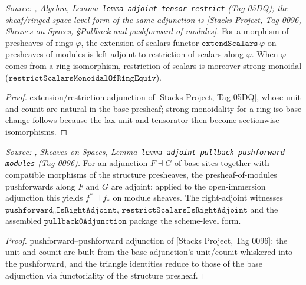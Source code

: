 \begin{lemma}
  \label{mk-lem:extend_scalars_adjunction}

  \textit{Source: \cite{stacks-project}, Algebra, Lemma~\texttt{lemma-adjoint-tensor-restrict}
  (Tag 05DQ); the sheaf/ringed-space-level form of the same adjunction is
  [Stacks Project, Tag 0096, \emph{Sheaves on Spaces}, \S Pullback and pushforward of
  modules].}
  For a morphism of presheaves of rings \(\varphi\), the extension-of-scalars functor
  \(\mathtt{extendScalars}\,\varphi\) on presheaves of modules is left adjoint to
  restriction of scalars along \(\varphi\). When \(\varphi\) comes from a ring
  isomorphism, restriction of scalars is moreover strong monoidal
  (\(\mathtt{restrictScalarsMonoidalOfRingEquiv}\)).
\end{lemma}
\begin{proof}
  extension/restriction adjunction of [Stacks Project, Tag 05DQ], whose unit and counit
  are natural in the base presheaf; strong monoidality for a ring-iso base change
  follows because the lax unit and tensorator then become sectionwise isomorphisms.
\end{proof}

\begin{lemma}
  \label{mk-lem:pushforward_adjunction}

  \textit{Source: \cite{stacks-project}, Sheaves on Spaces,
  Lemma~\texttt{lemma-adjoint-pullback-pushforward-modules} (Tag 0096).}
  For an adjunction \(F \dashv G\) of base sites together with compatible morphisms of the
  structure presheaves, the presheaf-of-modules pushforwards along \(F\) and \(G\) are
  adjoint; applied to the open-immersion adjunction this yields \(f^{*} \dashv f_{*}\) on
  module sheaves. The right-adjoint witnesses \(\mathtt{pushforward₀IsRightAdjoint}\),
  \(\mathtt{restrictScalarsIsRightAdjoint}\) and the assembled
  \(\mathtt{pullback0Adjunction}\) package the scheme-level form.
\end{lemma}
\begin{proof}
  pushforward--pushforward adjunction of [Stacks Project, Tag 0096]: the unit and counit
  are built from the base adjunction's unit/counit whiskered into the pushforward, and
  the triangle identities reduce to those of the base adjunction via functoriality of the
  structure presheaf.
\end{proof}

